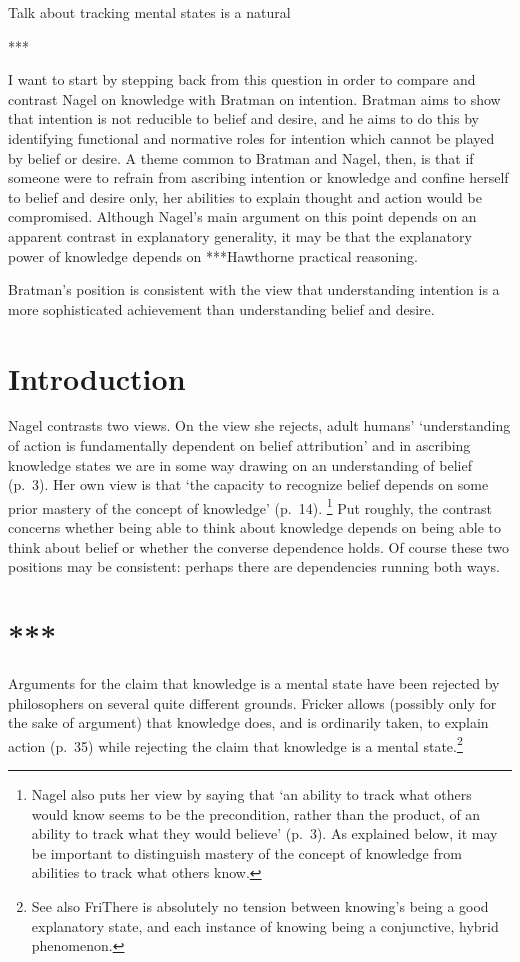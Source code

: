 \documentclass[11pt,a4paper]{extarticle}
\begin{document}
Talk about tracking mental states is a natural 

***

I want to start by stepping back from this question in order to compare and contrast Nagel on knowledge with Bratman on intention.
Bratman aims to show that intention is not reducible to belief and desire,
and he aims to do this by identifying functional and normative roles for intention which cannot be played by belief or desire.
A theme  common to Bratman and Nagel, then, is that if someone were to refrain from ascribing intention or knowledge and confine herself to belief and desire only, her abilities to explain thought and action would be compromised.
Although Nagel's main argument on this point depends on an apparent contrast in explanatory generality, it may be that the explanatory power of knowledge depends on ***Hawthorne practical reasoning.



Bratman's position is consistent with the view that understanding intention is a more sophisticated achievement than understanding belief and desire.




\section{Introduction}
Nagel contrasts two views.
On the view she rejects, adult humans' `understanding of action is fundamentally dependent on belief attribution' and in ascribing knowledge states we are in some way drawing on an understanding of belief (p.\ 3).
Her own view is that `the capacity to recognize belief depends on some prior mastery of the concept of knowledge' (p.\ 14).%
\footnote{
Nagel also puts her view by saying that `an ability to track what others would know seems to be the precondition, rather than the product, of an ability to track what they would believe' (p.\ 3).
As explained below, it may be important to distinguish mastery of the concept of knowledge from abilities to track what others know.
}
Put roughly, the contrast concerns whether being able to think about knowledge depends on being able to think about belief or whether the converse dependence holds.
Of course these two positions may be consistent: perhaps there are dependencies running both ways.  





\section{***}
Arguments for the claim that knowledge is a mental state have been rejected by philosophers on several quite different grounds.
Fricker allows (possibly only for the sake of argument) that knowledge does, and is ordinarily taken, to explain action (p.\ 35) while rejecting the claim that knowledge is a mental state.\footnote{
See also FriThere is absolutely no tension between knowing's being a good explanatory state, and each instance of knowing being a conjunctive, hybrid phenomenon. 
}
%
\end{document}
